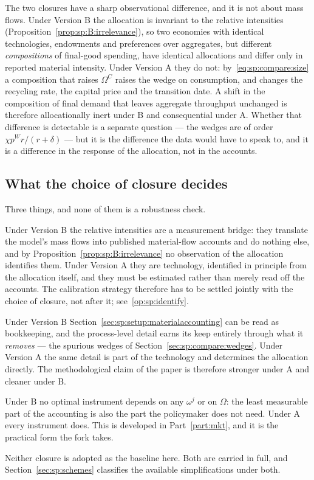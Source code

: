  The two closures have a sharp observational difference, and it
is not about mass flows. Under Version B the allocation is invariant to the relative intensities
(Proposition~\ref{prop:sp:B:irrelevance}), so two economies with identical technologies, endowments
and preferences over aggregates, but different \emph{compositions} of final-good spending, have
identical allocations and differ only in reported material intensity. Under Version A they do not:
by~\eqref{eq:sp:compare:size} a composition that raises $\Omega^C$ raises the wedge on consumption,
and changes the recycling rate, the capital price and the transition date. A shift in the composition
of final demand that leaves aggregate throughput unchanged is therefore allocationally inert under B
and consequential under A. Whether that difference is detectable is a separate question --- the
wedges are of order $\chi p^W r/(r+\delta)$ --- but it is the difference the data would have to speak
to, and it is a difference in the response of the allocation, not in the accounts.


\subsection{What the choice of closure decides}\label{sec:sp:compare:decides}

Three things, and none of them is a robustness check.

 Under Version B the relative intensities are a
measurement bridge: they translate the model's mass flows into published material-flow accounts and do
nothing else, and by Proposition~\ref{prop:sp:B:irrelevance} no observation of the allocation
identifies them. Under Version A they are technology, identified in principle from the allocation
itself, and they must be estimated rather than merely read off the accounts. The calibration strategy
therefore has to be settled jointly with the choice of closure, not after it;
see~\ref{op:sp:identify}.

 Under Version B
Section~\ref{sec:sp:setup:materialaccounting} can be read as bookkeeping, and the process-level detail
earns its keep entirely through what it \emph{removes} --- the spurious wedges of
Section~\ref{sec:sp:compare:wedges}. Under Version A the same detail is part of the technology and
determines the allocation directly. The methodological claim of the paper is therefore stronger under
A and cleaner under B.

 Under B no optimal instrument depends on any $\omega^j$
or on $\Omega$: the least measurable part of the accounting is also the part the policymaker does not
need. Under A every instrument does. This is developed in Part~\ref{part:mkt}, and it is the practical
form the fork takes.

Neither closure is adopted as the baseline here. Both are carried in full, and
Section~\ref{sec:sp:schemes} classifies the available simplifications under both.
